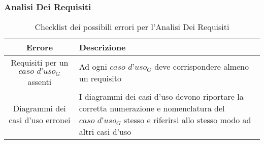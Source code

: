 \subsubsection{Analisi Dei Requisiti}
\begin{table}[h]
\centering
\begin{tabular}{|c|p{8cm}|}
\hline
\textbf{Errore} & \textbf{Descrizione} \\
\hline
Requisiti per un $\textit{caso d'uso}_G$ assenti &  Ad ogni $\textit{caso d'uso}_G$ deve corrispondere almeno un requisito\\
\hline
Diagrammi dei casi d'uso erronei & I diagrammi dei casi d'uso devono riportare la corretta numerazione e nomenclatura del $\textit{caso d'uso}_G$ stesso e riferirsi allo stesso modo ad altri casi d'uso\\
\hline
\end{tabular}
\caption{Checklist dei possibili errori per l'Analisi Dei Requisiti}
\end{table}